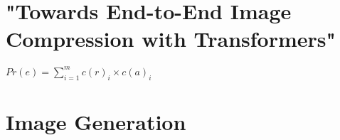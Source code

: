 

\newpage
\section{"Towards End-to-End Image Compression with Transformers"}




\begin{center}
$Pr(e) = \displaystyle\sum_{i=1}^{m} c(r)_i \times c(a)_i $
\end{center}

\section{Image Generation}


